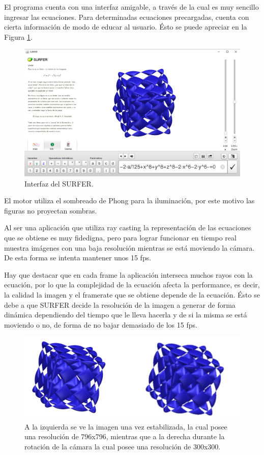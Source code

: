 \documentclass[12pt]{article}
\begin{document}
El programa cuenta con una interfaz amigable, a través de la cual es muy sencillo ingresar las ecuaciones. Para determinadas ecuaciones precargadas, cuenta con cierta información de modo de educar al usuario. Ésto se puede apreciar en la Figura \ref{interfazSURFER}.

\begin{figure}[h]
\includegraphics[width=\textwidth]{surfer_interfaz.png}
\caption{Interfaz del SURFER.}
\label{interfazSURFER}
\end{figure}

El motor utiliza el sombreado de Phong\cite{Phong} para la iluminación, por este motivo las figuras no proyectan sombras.

Al ser una aplicación que utiliza ray casting la representación de las ecuaciones que se obtiene es muy fidedigna, pero para lograr funcionar en tiempo real muestra imágenes con una baja resolución mientras se está moviendo la cámara. De esta forma se intenta mantener unos 15 fps.

Hay que destacar que en cada frame la aplicación interseca muchos rayos con la ecuación, por lo que la complejidad de la ecuación afecta la performance, es decir, la calidad la imagen  y el framerate que se obtiene depende de la ecuación. Ésto se debe a que SURFER decide la resolución de la imagen a generar de forma dinámica dependiendo del tiempo que le lleva hacerla y de si la misma se está moviendo o no, de forma de no bajar demasiado de los 15 fps.
\begin{figure}[h]
\includegraphics[width=\textwidth]{surfer_en_movimiento.png}
\caption{A la izquierda se ve la imagen una vez estabilizada, la cual posee una resolución de 796x796, mientras que a la derecha durante la rotación de la cámara la cual posee una resolución de 300x300.}
\label{malaRES1}
\end{figure}
\end{document}
